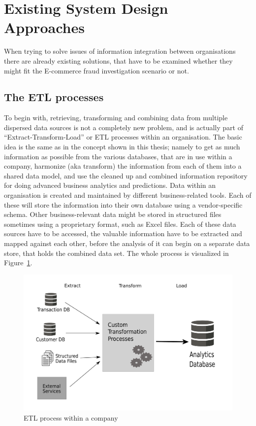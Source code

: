 
\section{Existing System Design Approaches}
\label{sec:system_approaches}

When trying to solve issues of information integration between organisations there are already existing solutions, that have to be examined whether they might fit the \gls{E-commerce} fraud investigation scenario or not.

\subsection{The \gls{ETL} processes}
\label{subsec:etl_process}

To begin with, retrieving, transforming and combining data from multiple dispersed data sources is not a completely new problem, and is actually part of ``Extract-Transform-Load'' or \gls{ETL} processes within an organisation. The basic idea is the same as in the concept shown in this thesis; namely to get as much information as possible from the various databases, that are in use within a company, harmonize (aka transform) the information from each of them into a shared data model, and use the cleaned up and combined information repository for doing advanced business analytics and predictions. Data within an organisation is created and maintained by different business-related tools. Each of these will store the information into their own database using a vendor-specific schema. Other business-relevant data might be stored in structured files sometimes using a proprietary format, such as Excel files. Each of these data sources have to be accessed, the valuable information have to be extracted and mapped against each other, before the analysis of it can begin on a separate data store, that holds the combined data set. The whole process is visualized in Figure~\ref{fig:images_etl_process}. \\

\begin{figure}[!ht]
  \centering
  \includegraphics[width=0.9\columnwidth]{images/etl_process.pdf}
  \caption{\gls{ETL} process within a company \citep[pg. 165]{wood2014linked}}
\label{fig:images_etl_process}
\end{figure}


